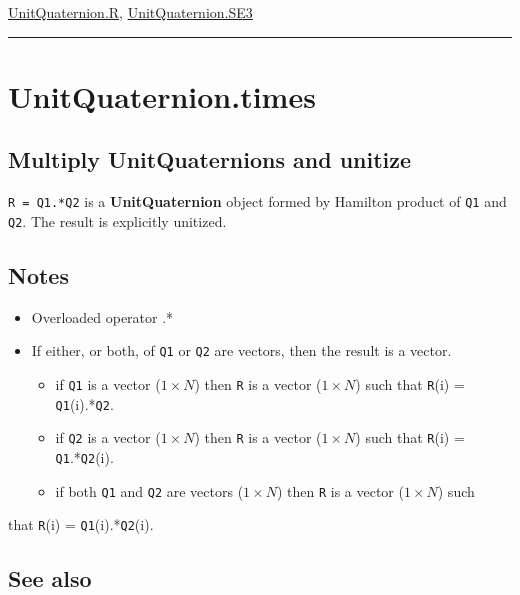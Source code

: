 \hyperlink{UnitQuaternion.R}{\color{blue} UnitQuaternion.R}, \hyperlink{UnitQuaternion.SE3}{\color{blue} UnitQuaternion.SE3}

\vspace{1.5ex}\hrule

\hypertarget{UnitQuaternion.times}{\section*{UnitQuaternion.times}}
\subsection*{Multiply UnitQuaternion\textquotesingle s and unitize}


\texttt{R = Q1.*Q2} is a \textbf{\color{red} UnitQuaternion} object formed by Hamilton product of \texttt{Q1} and
\texttt{Q2}. The result is explicitly unitized.


\subsection*{Notes}
\begin{itemize}
  \item Overloaded operator \textquotesingle .*\textquotesingle 
  \item If either, or both, of \texttt{Q1} or \texttt{Q2} are vectors, then the result is a vector.
\begin{itemize}
  \item if \texttt{Q1} is a vector ($1 \times N$) then \texttt{R} is a vector ($1 \times N$) such that \texttt{R}(i) = \texttt{Q1}(i).*\texttt{Q2}.
  \item if \texttt{Q2} is a vector ($1 \times N$) then \texttt{R} is a vector ($1 \times N$) such that \texttt{R}(i) = \texttt{Q1}.*\texttt{Q2}(i).
  \item if both \texttt{Q1} and \texttt{Q2} are vectors ($1 \times N$) then \texttt{R} is a vector ($1 \times N$) such
\end{itemize}
\end{itemize}


that \texttt{R}(i) = \texttt{Q1}(i).*\texttt{Q2}(i).


\subsection*{See also}



